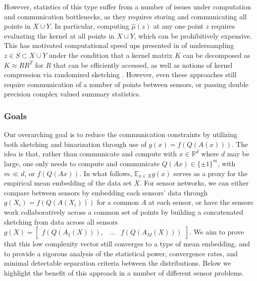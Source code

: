 \documentclass{article}
\newcommand{\R}{\mathbb{R}}
\begin{document}
However, statistics of this type suffer from a number of issues under computation and communication bottlenecks, as they requires storing and communicating all points in $X\cup Y$.  In particular, computing $\hat{\mu}(z)$ at any one point $z$ requires evaluating the kernel at all points in $X\cup Y$, which can be prohibitively expensive.
This has motivated computational speed ups presented in \cite{cheng2017two} of undersampling $z\in S\subset X\cup Y$ under the condition that a kernel matrix $K$ can be decomposed as $K\approx RR^T$ for $R$ that can be efficiently accessed, as well as notions of kernel compression via randomized sketching \cite{gribonval2017compressive}.  However, even these approaches still require communication of a number of points between sensors, or passing double precision complex valued summary statistics.  



\subsubsection*{Goals}
Our overarching goal is to reduce the communication constraints by utilizing both sketching and binarization 
through use of $g(x) = f(Q(A(x)))$.   
The idea is that, rather than communicate and compute with $x\in \R^d$ where $d$ may be large, one only needs to compute and communicate $Q(Ax)\in \{\pm 1\}^m$, with $m\ll d$, or $f(Q(Ax))$. In what follows, $\mathbb{E}_{x\in X} g(x)$ serves as a proxy for the empirical mean embedding of the data set $X$.  
For sensor networks, we can either compare between sensors by embedding each sensors' data through $g(X_i) = f(Q(A(X_i)))$ for a common $A$ at each sensor, or have the sensors work collaboratively across a common set of points by building a concatenated sketching from data across all sensors $g(X) = \begin{bmatrix}f(Q(A_1(X))), & ... & f(Q(A_M(X))) \end{bmatrix}$.
We aim to prove that this low complexity vector still converges to a type of mean embedding, and to provide a rigorous analysis of the statistical power, convergence rates, and minimal detectable separation criteria between the distributions.  Below we highlight the benefit of this approach in a number of different sensor problems. 
\end{document}
